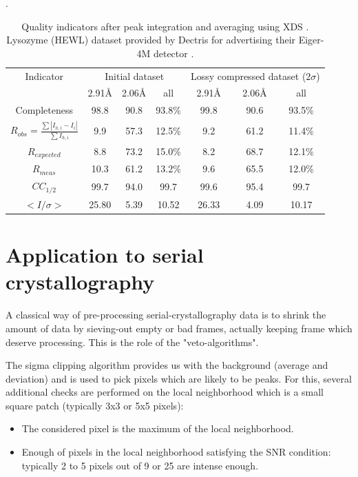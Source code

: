 \documentclass[preprint]{iucr}              %
\begin{document}
\begin{table}
\label{xds_summary}
\caption{Quality indicators after peak integration and averaging using XDS \cite{xds}. 
Lysozyme (HEWL) dataset provided by Dectris for advertising their Eiger-4M detector \cite{lysozyme}.}.
\begin{tabular}{|c|c c c|c c c|} 
\hline
Indicator & \multicolumn{3}{c|}{Initial dataset} & \multicolumn{3}{c|}{Lossy compressed dataset ($2\sigma$)} \\ 
          & 2.91\AA & 2.06\AA & all & 2.91\AA & 2.06\AA & all \\
\hline
Completeness                                        & 98.8& 90.8 & 93.8\% & 99.8& 90.6 & 93.5\% \\ 
$R_{obs}=\frac{\sum |I_{h,i}-I_{i}|}{\sum I_{h,i}}$ & 9.9 & 57.3& 12.5\% & 9.2 & 61.2&  11.4\%\\ 
$R_{expected}$                                      & 8.8 & 73.2& 15.0\% & 8.2 & 68.7 &  12.1\%\\
$R_{meas}$ \cite{Rmeas}  &10.3 &61.2& 13.2\% & 9.6 & 65.5 & 12.0\%\\
$CC_{1/2}$ \cite{cc1/2}  & 99.7 &94.0 & 99.7   & 99.6 & 95.4 & 99.7  \\
$<I/\sigma>$               & 25.80 & 5.39 & 10.52  & 26.33& 4.09 & 10.17 \\
\hline
\end{tabular}
\end{table}


\section{Application to serial crystallography}
A classical way of pre-processing serial-crystallography data is to shrink the amount of data by sieving-out empty or bad frames, actually keeping frame which deserve processing. 
This is the role of the "veto-algorithms".

The sigma clipping algorithm provides us with the background (average and deviation) and is used to pick pixels which are likely to be peaks. 
For this,  several additional checks are performed on the local neighborhood which is a small square patch (typically 3x3 or 5x5 pixels):
\begin{itemize}
\item The considered pixel is the maximum of the local neighborhood.
\item Enough of pixels in the local neighborhood satisfying the SNR condition: typically 2 to 5 pixels out of 9 or 25 are intense enough.
\end{itemize}
\end{document}
